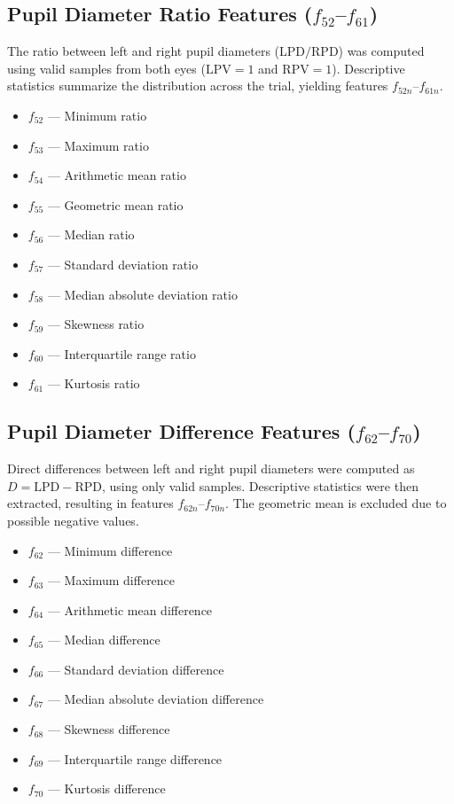 \documentclass[12pt]{report}
\begin{document}
\subsection[Pupil Diameter Ratio Features (f52–f61)]{Pupil Diameter Ratio Features (\(f_{52}\)–\(f_{61}\))}

The ratio between left and right pupil diameters (\(\mathrm{LPD}/\mathrm{RPD}\)) was computed using valid samples from both eyes (\(\mathrm{LPV} = 1\) and \(\mathrm{RPV} = 1\)). 
Descriptive statistics summarize the distribution across the trial, yielding features \(f_{52n}\)--\(f_{61n}\).

\begin{itemize}
    \item \(f_{52}\) — Minimum ratio
    \item \(f_{53}\) — Maximum ratio
    \item \(f_{54}\) — Arithmetic mean ratio
    \item \(f_{55}\) — Geometric mean ratio
    \item \(f_{56}\) — Median ratio
    \item \(f_{57}\) — Standard deviation ratio
    \item \(f_{58}\) — Median absolute deviation ratio
    \item \(f_{59}\) — Skewness ratio
    \item \(f_{60}\) — Interquartile range ratio
    \item \(f_{61}\) — Kurtosis ratio
\end{itemize}

\subsection[Pupil Diameter Difference Features (f62–f70)]{Pupil Diameter Difference Features (\(f_{62}\)–\(f_{70}\))}

Direct differences between left and right pupil diameters were computed as \(D = \mathrm{LPD} - \mathrm{RPD}\), using only valid samples. 
Descriptive statistics were then extracted, resulting in features \(f_{62n}\)--\(f_{70n}\). The geometric mean is excluded due to possible negative values.

\begin{itemize}
    \item \(f_{62}\) — Minimum difference
    \item \(f_{63}\) — Maximum difference
    \item \(f_{64}\) — Arithmetic mean difference
    \item \(f_{65}\) — Median difference
    \item \(f_{66}\) — Standard deviation difference
    \item \(f_{67}\) — Median absolute deviation difference
    \item \(f_{68}\) — Skewness difference
    \item \(f_{69}\) — Interquartile range difference
    \item \(f_{70}\) — Kurtosis difference
\end{itemize}
\end{document}
